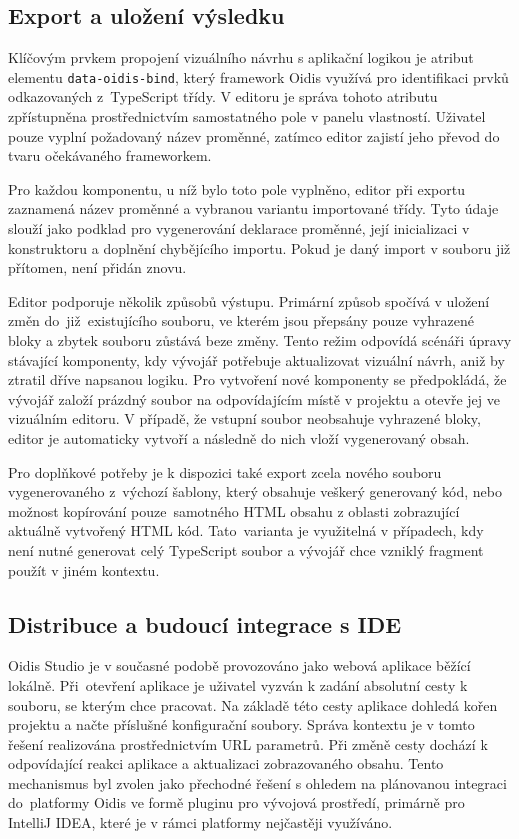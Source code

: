 \subsection{Export a uložení výsledku}
Klíčovým prvkem propojení vizuálního návrhu s aplikační logikou je atribut elementu \texttt{data-oidis-bind}, který framework Oidis využívá pro identifikaci prvků odkazovaných z~TypeScript třídy. V editoru je správa tohoto atributu zpřístupněna prostřednictvím samostatného pole v panelu vlastností. Uživatel pouze vyplní požadovaný název proměnné, zatímco editor zajistí jeho převod do tvaru očekávaného frameworkem.

Pro každou komponentu, u níž bylo toto pole vyplněno, editor při exportu zaznamená název proměnné a vybranou variantu importované třídy. Tyto údaje slouží jako podklad pro vygenerování deklarace proměnné, její inicializaci v konstruktoru a doplnění chybějícího importu. Pokud je daný import v souboru již přítomen, není přidán znovu.

Editor podporuje několik způsobů výstupu. Primární způsob spočívá v uložení změn do~již~existujícího souboru, ve kterém jsou přepsány pouze vyhrazené bloky a zbytek souboru zůstává beze změny. Tento režim odpovídá scénáři úpravy stávající komponenty, kdy vývojář potřebuje aktualizovat vizuální návrh, aniž by ztratil dříve napsanou logiku. Pro vytvoření nové komponenty se předpokládá, že vývojář založí prázdný soubor na odpovídajícím místě v projektu a otevře jej ve vizuálním editoru. V případě, že vstupní soubor neobsahuje vyhrazené bloky, editor je automaticky vytvoří a následně do nich vloží vygenerovaný obsah.

Pro doplňkové potřeby je k dispozici také export zcela nového souboru vygenerovaného z~výchozí šablony, který obsahuje veškerý generovaný kód, nebo možnost kopírování pouze~samotného HTML obsahu z oblasti zobrazující aktuálně vytvořený HTML kód. Tato~varianta je využitelná v případech, kdy není nutné generovat celý TypeScript soubor a vývojář chce vzniklý fragment použít v jiném kontextu.

\subsection{Distribuce a budoucí integrace s IDE}

Oidis Studio je v současné podobě provozováno jako webová aplikace běžící lokálně. Při~otevření aplikace je uživatel vyzván k zadání absolutní cesty k souboru, se kterým chce pracovat. Na základě této cesty aplikace dohledá kořen projektu a načte příslušné konfigurační soubory. Správa kontextu je v tomto řešení realizována prostřednictvím URL parametrů. Při změně cesty dochází k odpovídající reakci aplikace a aktualizaci zobrazovaného obsahu. Tento mechanismus byl zvolen jako přechodné řešení s ohledem na plánovanou integraci do~platformy Oidis ve formě pluginu pro vývojová prostředí, primárně pro IntelliJ IDEA, které je v rámci platformy nejčastěji využíváno.

